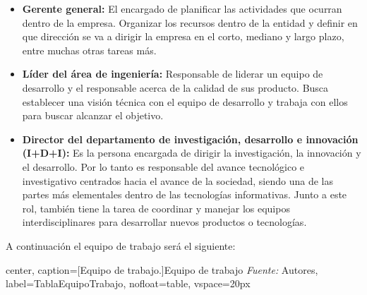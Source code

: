 \begin{itemize}
	\item \textbf{Gerente general:} El encargado de planificar las actividades que ocurran dentro de la empresa. Organizar los recursos dentro de la entidad y definir en que dirección se va a dirigir la empresa en el corto, mediano y largo plazo, entre muchas otras tareas más.
	
	\item \textbf{Líder del área de ingeniería:} Responsable de liderar un equipo de desarrollo y el responsable acerca de la calidad de sus producto. Busca establecer una visión técnica con el equipo de desarrollo y trabaja con ellos para buscar alcanzar el objetivo.
	
	\item \textbf{Director del departamento de investigación, desarrollo e innovación (I+D+I):} Es la persona encargada de dirigir la investigación, la innovación y el desarrollo. Por lo tanto es responsable del avance tecnológico e investigativo centrados hacia el avance de la sociedad, siendo una de las partes más elementales dentro de las tecnologías informativas. Junto a este rol, también tiene la tarea de coordinar y manejar los equipos interdisciplinares para desarrollar nuevos productos o tecnologías.
\end{itemize}

A continuación el equipo de trabajo será el siguiente:

\begin{adjustbox}{
		center,
		caption=[{Equipo de trabajo.}]{\centering Equipo de trabajo \textit{Fuente:} Autores},
		label={TablaEquipoTrabajo},
		nofloat=table, vspace={20px}}
\end{adjustbox}


